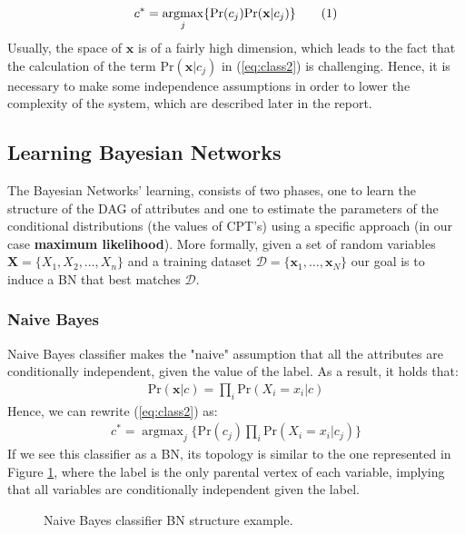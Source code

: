 \documentclass[11pt]{article}
\newcommand\numberthis{\addtocounter{equation}{1}\tag{\theequation}}
\DeclareMathOperator*{\argmax}{argmax} %
\begin{document}
	\begin{align*}
		c^* = \argmax_j\{\text{Pr}(c_j)\text{Pr}(\mathbf{x}|c_j)\} \numberthis \label{eq:class2}
	\end{align*}
	Usually, the space of $\mathbf{x}$ is of a fairly high dimension, which leads to the fact that the calculation of the term $\text{Pr}(\mathbf{x}|c_j)$ in (\ref{eq:class2}) is challenging. Hence, it is necessary to make some independence assumptions in order to lower the complexity of the system, which are described later in the report.
	
	\subsection{Learning Bayesian Networks \label{sec:learning_bayesian_networks}}
	The Bayesian Networks' learning, consists of two phases, one to learn the structure of the DAG of attributes and one to estimate the parameters of the conditional distributions (the values of CPT's) using a specific approach (in our case \textbf{maximum likelihood}). More formally, given a set of random variables $\mathbf{X} = \{X_1, X_2,\dots,X_n\}$ and a training dataset $\mathcal{D} = \{\mathbf{x}_1,\dots,\mathbf{x}_N\}$ our goal is to induce a BN that best matches $\mathcal{D}$.
	
	\subsubsection{Naive Bayes \label{naive_bayes}}
	Naive Bayes classifier makes the "naive" assumption that all the attributes are conditionally independent, given the value of the label. As a result, it holds that:
	\begin{align*}
		\text{Pr}(\mathbf{x}|c) = \prod_{i} \text{Pr}(X_i=x_i|c)
	\end{align*}
	Hence, we can rewrite (\ref{eq:class2}) as:
	\begin{align*}
		c^* = \argmax_j\{\text{Pr}(c_j) \prod_{i}\text{Pr}(X_i=x_i|c_j)\}
	\end{align*}
	If we see this classifier as a BN, its topology is similar to the one represented in Figure \ref{fig:naive_bayes_net}, where the label is the only parental vertex of each variable, implying that all variables are conditionally independent given the label.
	\begin{figure}[H]
		\caption{Naive Bayes classifier BN structure example.}
		\label{fig:naive_bayes_net}
	\end{figure}
	
\end{document}
